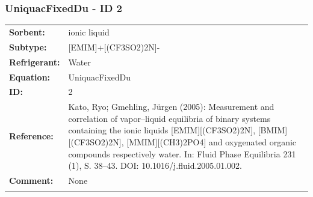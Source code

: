 \subsubsection{UniquacFixedDu - ID 2}
%
\begin{tabular}[l]{|lp{11.5cm}|}
\hline
\addlinespace

\textbf{Sorbent:} & ionic liquid \\
\textbf{Subtype:} & [EMIM]+[(CF3SO2)2N]- \\
\textbf{Refrigerant:} & Water \\
\textbf{Equation:} & UniquacFixedDu \\
\textbf{ID:} & 2 \\
\textbf{Reference:} & Kato, Ryo; Gmehling, Jürgen (2005): Measurement and correlation of vapor–liquid equilibria of binary systems containing the ionic liquids [EMIM][(CF3SO2)2N], [BMIM][(CF3SO2)2N], [MMIM][(CH3)2PO4] and oxygenated organic compounds respectively water. In: Fluid Phase Equilibria 231 (1), S. 38–43. DOI: 10.1016/j.fluid.2005.01.002. \\
\textbf{Comment:} & None \\

\addlinespace
\hline
\end{tabular}
\newline

